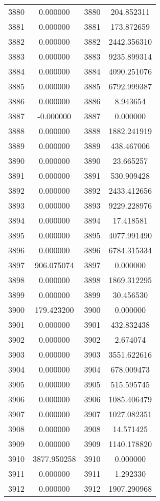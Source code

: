 \documentclass[12pt]{article}
\begin{document}
\begin{longtable}{@{}cccc@{}}
3880 & 0.000000 & 3880 & 204.852311 \\
3881 & 0.000000 & 3881 & 173.872659 \\
3882 & 0.000000 & 3882 & 2442.356310 \\
3883 & 0.000000 & 3883 & 9235.899314 \\
3884 & 0.000000 & 3884 & 4090.251076 \\
3885 & 0.000000 & 3885 & 6792.999387 \\
3886 & 0.000000 & 3886 & 8.943654 \\
3887 & -0.000000 & 3887 & 0.000000 \\
3888 & 0.000000 & 3888 & 1882.241919 \\
3889 & 0.000000 & 3889 & 438.467006 \\
3890 & 0.000000 & 3890 & 23.665257 \\
3891 & 0.000000 & 3891 & 530.909428 \\
3892 & 0.000000 & 3892 & 2433.412656 \\
3893 & 0.000000 & 3893 & 9229.228976 \\
3894 & 0.000000 & 3894 & 17.418581 \\
3895 & 0.000000 & 3895 & 4077.991490 \\
3896 & 0.000000 & 3896 & 6784.315334 \\
3897 & 906.075074 & 3897 & 0.000000 \\
3898 & 0.000000 & 3898 & 1869.312295 \\
3899 & 0.000000 & 3899 & 30.456530 \\
3900 & 179.423200 & 3900 & 0.000000 \\
3901 & 0.000000 & 3901 & 432.832438 \\
3902 & 0.000000 & 3902 & 2.674074 \\
3903 & 0.000000 & 3903 & 3551.622616 \\
3904 & 0.000000 & 3904 & 678.009473 \\
3905 & 0.000000 & 3905 & 515.595745 \\
3906 & 0.000000 & 3906 & 1085.406479 \\
3907 & 0.000000 & 3907 & 1027.082351 \\
3908 & 0.000000 & 3908 & 14.571425 \\
3909 & 0.000000 & 3909 & 1140.178820 \\
3910 & 3877.950258 & 3910 & 0.000000 \\
3911 & 0.000000 & 3911 & 1.292330 \\
3912 & 0.000000 & 3912 & 1907.290968 \\

\end{longtable}
\end{document}

